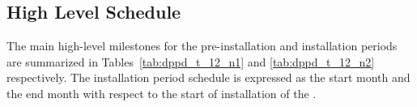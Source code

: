 \subsection{High Level Schedule}


The main high-level milestones for the pre-installation and installation periods are summarized in Tables~\ref{tab:dppd_t_12_n1} and \ref{tab:dppd_t_12_n2} respectively. The installation period schedule is expressed as the start month and the end month with respect to the start of installation of the \dune \dual.



